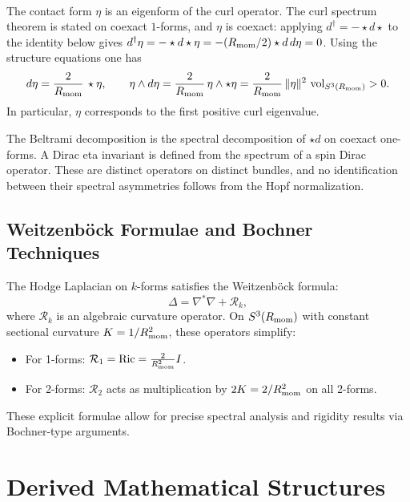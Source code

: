 \documentclass[11pt]{article}
\begin{document}
\begin{remark}
\mbox{}\\[6pt] 
The contact form $\eta$ is an eigenform of the curl operator.  The curl
spectrum theorem is stated on coexact \(1\)-forms, and \(\eta\) is coexact:
applying \(d^\dagger=-\star d\star\) to the identity below gives
\(d^\dagger\eta=-\star d\star\eta=-(R_{\mathrm{mom}}/2)\star d\,d\eta=0\).  Using the structure equations one has
\[
d\eta=\frac{2}{R_{\mathrm{mom}}}\,\star\eta,
\qquad
\eta\wedge d\eta=\frac{2}{R_{\mathrm{mom}}}\,\eta\wedge\star\eta=\frac{2}{R_{\mathrm{mom}}}\,\|\eta\|^{2}\,\operatorname{vol}_{S^3(R_{\mathrm{mom}})}>0.
\]
In particular, $\eta$ corresponds to the first positive curl eigenvalue.
\end{remark}

\begin{remark}
\label{p1:rem:beltrami-not-eta-source}
The Beltrami decomposition is the spectral decomposition of
\(\star d\) on coexact one-forms.  A Dirac eta invariant is defined from the
spectrum of a spin Dirac operator.  These are distinct operators on distinct
bundles, and no identification between their spectral asymmetries follows from
the Hopf normalization.
\end{remark}

\subsection{Weitzenb\"ock Formulae and Bochner Techniques}

The Hodge Laplacian on $k$-forms satisfies the Weitzenb\"ock formula\cite{berline1992heat,besse1978manifolds}:
\[
\Delta = \nabla^*\nabla + \mathcal R_k,
\]
where $\mathcal R_k$ is an algebraic curvature operator. On $S^3(R_{\mathrm{mom}})$ with constant sectional curvature $K = 1/R_{\mathrm{mom}}^2$, these operators simplify:

\begin{itemize}
\item For 1-forms: $\mathcal R_1 = \mathrm{Ric} = \frac{2}{R_{\mathrm{mom}}^2}I$.
\item For 2-forms: $\mathcal R_2$ acts as multiplication by $2K = 2/R_{\mathrm{mom}}^2$ on all 2-forms.
\end{itemize}

These explicit formulae allow for precise spectral analysis and rigidity results via Bochner-type arguments.


\section{Derived Mathematical Structures}
\label{p1:sec:derived-structures}
\end{document}
